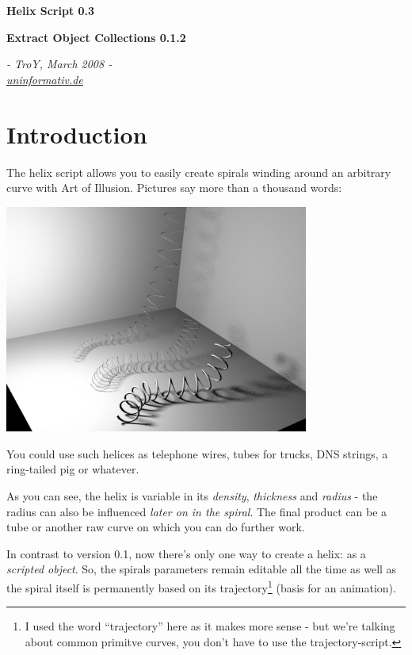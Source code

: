 \documentclass[12pt,a4paper]{scrartcl}
\begin{document}
	\begin{center}
		\begin{LARGE}
			\textbf{Helix Script 0.3}
		\end{LARGE}
		
		\textbf{Extract Object Collections 0.1.2}

		\textit{- TroY, March 2008 -} \\
		\textit{\href{http://www.uninformativ.de}{uninformativ.de}}
	\end{center}
	
\bigskip

\tableofcontents

\pagebreak

\section{Introduction}
The helix script allows you to easily create spirals winding around
an arbitrary curve with Art of Illusion. Pictures say more than a
thousand words:

\begin{center}
	\includegraphics[width=0.75\textwidth]{../pics/presentation-bright.jpg}
\end{center}

You could use such helices as telephone wires, tubes for trucks,
DNS strings, a ring-tailed pig or whatever.

As you can see, the helix is variable in its \emph{density},
\emph{thickness} and \emph{radius} - the radius can also be influenced
\emph{later on in the spiral}. The final product can be a tube or another
raw curve on which you can do further work.

In contrast to version 0.1, now there's only one way to create a helix:
as a \emph{scripted object}. So, the spirals parameters remain editable
all the time as well as the spiral itself is permanently based on its
trajectory\footnote{I used the word ``trajectory'' here
as it makes more sense - but we're talking about common primitve curves,
you don't have to use the trajectory-script.} (basis for an animation).
\end{document}
